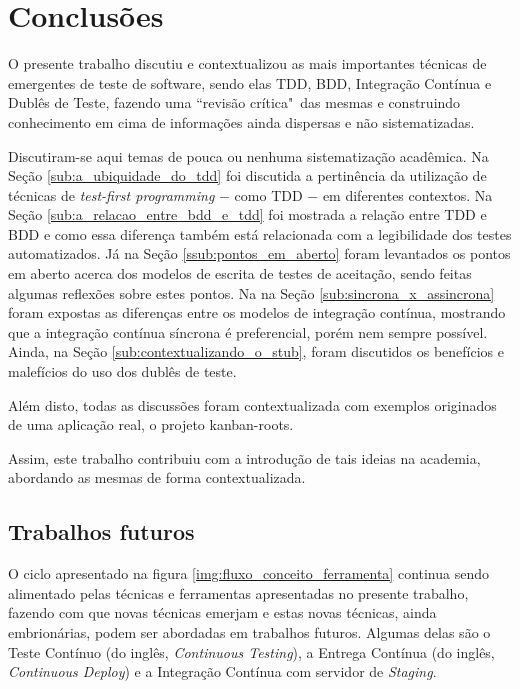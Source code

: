 \chapter{Conclusões}
\label{cha:conclusoes}

O presente trabalho discutiu e contextualizou as mais importantes técnicas de emergentes de teste de software, sendo elas TDD, BDD, Integração Contínua e Dublês de Teste, fazendo uma ``revisão crítica"\ das mesmas e construindo conhecimento em cima de informações ainda dispersas e não sistematizadas.

Discutiram-se aqui temas de pouca ou nenhuma sistematização acadêmica. Na Seção \ref{sub:a_ubiquidade_do_tdd} foi discutida a pertinência da utilização de técnicas de \textit{test-first programming} $-$ como TDD $-$ em diferentes contextos. Na Seção \ref{sub:a_relacao_entre_bdd_e_tdd} foi mostrada a relação entre TDD e BDD e como essa diferença também está relacionada com a legibilidade dos testes automatizados. Já na Seção \ref{ssub:pontos_em_aberto} foram levantados os pontos em aberto acerca dos modelos de escrita de testes de aceitação, sendo feitas algumas reflexões sobre estes pontos. Na na Seção \ref{sub:sincrona_x_assincrona} foram expostas as diferenças entre os modelos de integração contínua, mostrando que a integração contínua síncrona é preferencial, porém nem sempre possível. Ainda, na Seção \ref{sub:contextualizando_o_stub}, foram discutidos os benefícios e malefícios do uso dos dublês de teste.

Além disto, todas as discussões foram contextualizada com exemplos originados de uma aplicação real, o projeto kanban-roots.

Assim, este trabalho contribuiu com a introdução de tais ideias na academia, abordando as mesmas de forma contextualizada.

\section{Trabalhos futuros}
\label{sec:trabalhos_futuros}

O ciclo apresentado na figura \ref{img:fluxo_conceito_ferramenta} continua sendo alimentado pelas técnicas e ferramentas apresentadas no presente trabalho, fazendo com que novas técnicas emerjam e estas novas técnicas, ainda embrionárias, podem ser abordadas em trabalhos futuros. Algumas delas são o Teste Contínuo (do inglês, \textit{Continuous Testing}), a Entrega Contínua (do inglês, \textit{Continuous Deploy}) e a Integração Contínua com servidor de \textit{Staging}.